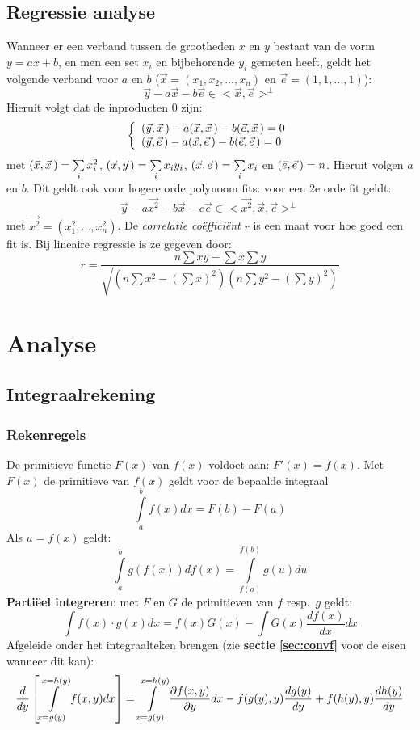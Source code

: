 \documentclass[twoside]{report}
\begin{document}
\section{Regressie analyse}
Wanneer er een verband tussen de grootheden $x$ en $y$ bestaat van de vorm
$y=ax+b$, en men een set $x_i$ en bijbehorende $y_i$ gemeten heeft, geldt het
volgende verband voor $a$ en $b$ ($\vec{x}=(x_1,x_2,...,x_n)$ en
$\vec{e}=(1,1,...,1)$):
\[
\vec{y}-a\vec{x}-b\vec{e}\in<\vec{x},\vec{e}>^\perp
\]
Hieruit volgt dat de inproducten 0 zijn:
\[
\left\{
\begin{array}{l}
(\vec{y},\vec{x}\,)-a(\vec{x},\vec{x}\,)-b(\vec{e},\vec{x}\,)=0\\
(\vec{y},\vec{e}\,)-a(\vec{x},\vec{e}\,)-b(\vec{e},\vec{e}\,)=0
\end{array}\right.
\]
met $(\vec{x},\vec{x}\,)=\sum\limits_i x_i^2$, $(\vec{x},\vec{y}\,)=\sum\limits_ix_iy_i$,
$(\vec{x},\vec{e}\,)=\sum\limits_ix_i$ en $(\vec{e},\vec{e}\,)=n$.
Hieruit volgen $a$ en $b$.
\npar
Dit geldt ook voor hogere orde polynoom fits: voor een 2e orde fit geldt:
\[
\vec{y}-a\vec{x^2}-b\vec{x}-c\vec{e}\in<\vec{x^2},\vec{x},\vec{e}>^\perp
\]
met $\vec{x^2}=(x_1^2,...,x_n^2)$.
\npar
De {\it correlatie co\"effici\"ent} $r$ is een maat voor hoe goed een fit is.
Bij lineaire regressie is ze gegeven door:
\[
r=\frac{n\sum xy-\sum x\sum y}{\sqrt{(n\sum x^2-(\sum x)^2)(n\sum y^2-(\sum y)^2)}}
\]


\chapter{Analyse}
\section{Integraalrekening}
\subsection{Rekenregels}
De primitieve functie $F(x)$ van $f(x)$ voldoet aan: $F'(x)=f(x)$. Met
$F(x)$ de primitieve van $f(x)$ geldt voor de bepaalde integraal
\[
\int\limits_a^bf(x)dx=F(b)-F(a)
\]
Als $u=f(x)$ geldt:
\[
\int\limits_a^bg(f(x))df(x)=\int\limits_{f(a)}^{f(b)}g(u)du
\]
{\bf Parti\"eel integreren}: met $F$ en $G$ de primitieven van $f$ resp.\ $g$
geldt:
\[
\int f(x)\cdot g(x)dx=f(x)G(x)-\int G(x)\frac{df(x)}{dx}dx
\]
Afgeleide onder het integraalteken brengen (zie {\bf sectie \ref{sec:convf}}
voor de eisen wanneer dit kan):
\[
\frac{d}{dy}\left[\int\limits_{x=g(y)}^{x=h(y)}f(x,y)dx\right]=
\int\limits_{x=g(y)}^{x=h(y)}\frac{\partial f(x,y)}{\partial y}dx-f(g(y),y)\frac{dg(y)}{dy}+f(h(y),y)\frac{dh(y)}{dy}
\]
\end{document}
